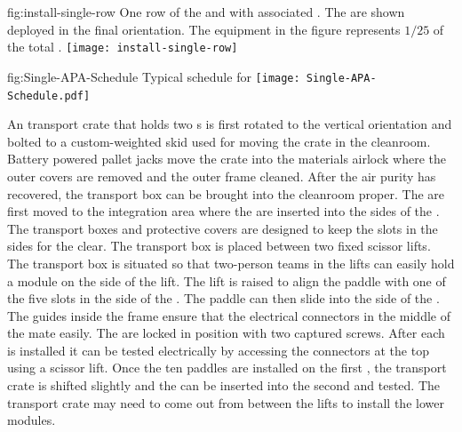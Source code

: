 \begin{dunefigure}{fig:install-single-row}
{One row of the  and  with associated . The  are shown deployed in the final orientation. The equipment in the figure represents $1/25$ of the total .}
 \texttt{[image: install-single-row]}
\end{dunefigure}

\begin{dunefigure}
{fig:Single-APA-Schedule}
{Typical  schedule for }
\texttt{[image: Single-APA-Schedule.pdf]}
\end{dunefigure}


  
An  transport crate that holds two s  is first rotated to the vertical orientation and bolted to a custom-weighted skid used for moving the crate in the cleanroom. 
Battery powered pallet jacks %
move the crate into the materials airlock where the outer covers are removed and the outer frame cleaned. 
After the air purity has recovered, the transport box can be brought into the cleanroom proper. 
The  are first moved to the  integration area where the  are inserted into the sides of the . 
The  transport boxes and  protective covers are designed to keep the slots in the sides for the  clear. 
The  transport box is placed between two fixed scissor lifts. The transport box is situated so that two-person teams in the lifts can easily hold a  module on the side of the lift. 
The lift is raised to align the paddle with one of the five slots in the side of the . The paddle can then slide %
into the side of the . 
The guides inside the  frame ensure that the electrical connectors in the middle of the  mate easily. 
The  are locked in position with two captured screws. 
After each  is installed it can be tested electrically by accessing the connectors at the top using a scissor lift. 
Once the ten  paddles are installed on the first , the transport crate is shifted slightly and the  can be inserted into the second  and tested. %
The  transport crate may need to come out from between the lifts to install the lower  modules.

